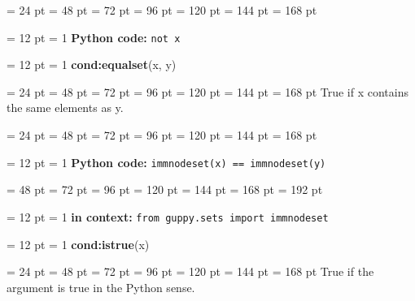 {{\par \noindent  \leftskip = 24 pt  \leftmargini = 48 pt  \leftmarginii = 72 pt  \leftmarginiii = 96 pt  \leftmarginiv = 120 pt  \leftmarginv = 144 pt  \leftmarginvi = 168 pt {\par \noindent
{\par \pagebreak[3.200000] \noindent \hangindent = 12 pt \hangafter = 1 
{\bf Python code: \/}{\tt not x\/}\par}
\par}
\par}
{\par \pagebreak[3.300000] \noindent \hangindent = 12 pt \hangafter = 1 
{\bf {\large {\bf cond:equalset\/}}\/}(x, y)\par}
{\par \noindent  \leftskip = 24 pt  \leftmargini = 48 pt  \leftmarginii = 72 pt  \leftmarginiii = 96 pt  \leftmarginiv = 120 pt  \leftmarginv = 144 pt  \leftmarginvi = 168 pt  True if x contains the same elements as y.\par}
{\par \noindent  \leftskip = 24 pt  \leftmargini = 48 pt  \leftmarginii = 72 pt  \leftmarginiii = 96 pt  \leftmarginiv = 120 pt  \leftmarginv = 144 pt  \leftmarginvi = 168 pt {\par \noindent
{\par \pagebreak[3.200000] \noindent \hangindent = 12 pt \hangafter = 1 
{\bf Python code: \/}{\tt immnodeset(x) == immnodeset(y)\/}\par}
{\par \noindent  \leftskip = 48 pt  \leftmargini = 72 pt  \leftmarginii = 96 pt  \leftmarginiii = 120 pt  \leftmarginiv = 144 pt  \leftmarginv = 168 pt  \leftmarginvi = 192 pt {\par \noindent
{\par \pagebreak[3.100000] \noindent \hangindent = 12 pt \hangafter = 1 
{\bf in context: \/}{\tt from guppy.sets import immnodeset\/}\par}
\par}
\par}
\par}
\par}
{\par \pagebreak[3.300000] \noindent \hangindent = 12 pt \hangafter = 1 
{\bf {\large {\bf cond:istrue\/}}\/}(x)\par}
{\par \noindent  \leftskip = 24 pt  \leftmargini = 48 pt  \leftmarginii = 72 pt  \leftmarginiii = 96 pt  \leftmarginiv = 120 pt  \leftmarginv = 144 pt  \leftmarginvi = 168 pt  True if the argument is true in the Python sense.\par}
}
